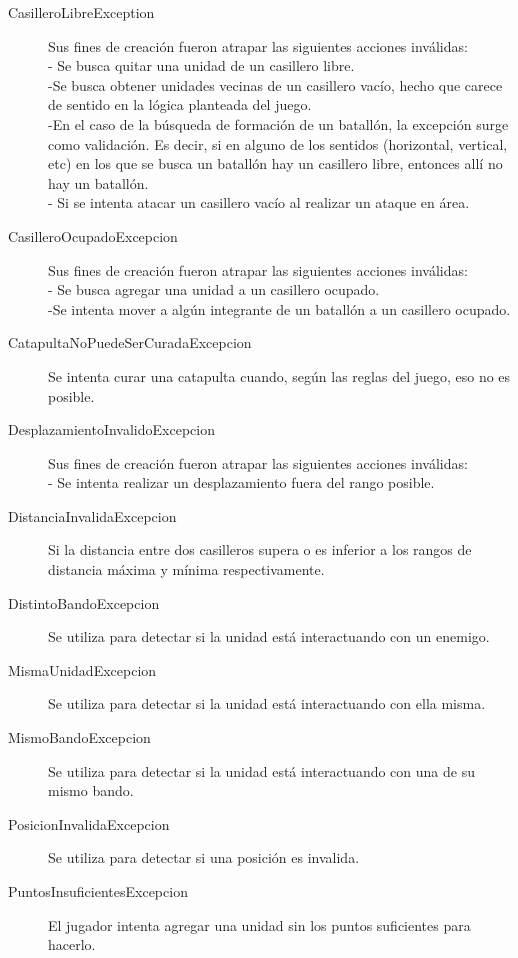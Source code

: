 \documentclass[titlepage,a4paper]{article}
\begin{document}
\begin{description}
\item[CasilleroLibreException] Sus fines de creación fueron atrapar las siguientes acciones inválidas:  \\ \hspace{}
- Se busca quitar una unidad de un casillero libre.  \\ \hspace{}
-Se busca obtener unidades vecinas de un casillero vacío, hecho que carece de sentido en la lógica planteada del juego. \\ \hspace{}
-En el caso de la búsqueda de formación de un batallón, la excepción surge como validación. Es decir, si en alguno de los sentidos (horizontal, vertical, etc) en los que se busca un batallón hay un casillero libre, entonces allí no hay un batallón. \\ \hspace{}
- Si se intenta atacar un casillero vacío al realizar un ataque en área. 
\item[CasilleroOcupadoExcepcion] Sus fines de creación fueron atrapar las siguientes acciones inválidas: \\ \hspace{}
- Se busca agregar una unidad a un casillero ocupado. \\ \hspace{}
-Se intenta mover a algún integrante de un batallón a un casillero ocupado.
\item[CatapultaNoPuedeSerCuradaExcepcion] Se intenta curar una catapulta cuando, según las reglas del juego, eso no es posible. 
\item[DesplazamientoInvalidoExcepcion] Sus fines de creación fueron atrapar las siguientes acciones inválidas:\\ \hspace{}
- Se intenta realizar un desplazamiento fuera del rango posible. 
\item[DistanciaInvalidaExcepcion] Si la distancia entre dos casilleros supera o es inferior a los rangos de distancia máxima y mínima respectivamente. 
\item[DistintoBandoExcepcion] Se utiliza para detectar si la unidad está interactuando con un enemigo. 
\item[MismaUnidadExcepcion] Se utiliza para detectar si la unidad está interactuando con ella misma. 
\item[MismoBandoExcepcion] Se utiliza para detectar si la unidad está interactuando con una de su mismo bando. 
\item[PosicionInvalidaExcepcion] Se utiliza para detectar si una posición es invalida. \\ \hspace{}
\item[PuntosInsuficientesExcepcion] El jugador intenta agregar una unidad sin los puntos suficientes para hacerlo. 
\\ \hspace{}
\end{description}
\end{document}
